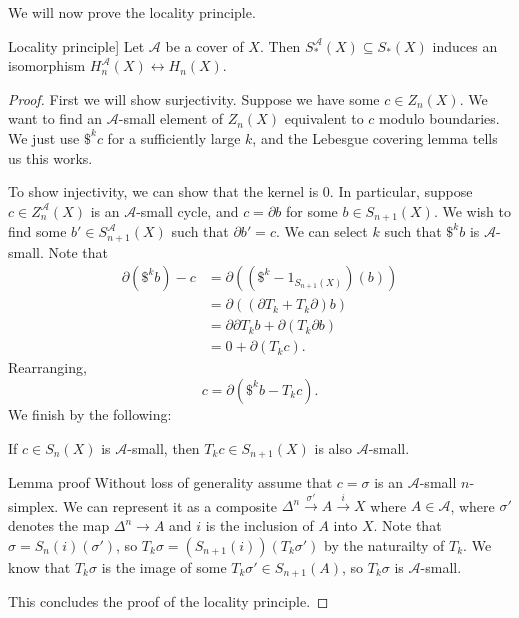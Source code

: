 \documentclass{standalone}
\begin{document}
We will now prove the locality principle.
\begin{theorem*}[\hyperref[thm:locality]{Locality principle}]
  Let \(\mathcal A\) be a cover of \(X\).
  Then \(S_*^{\mathcal A}(X) \subseteq S_*(X)\)
  induces an isomorphism \(H_n^{\mathcal A}(X) \leftrightarrow H_n(X)\).
\end{theorem*}
\begin{proof}
  First we will show surjectivity. Suppose we have some \(c \in Z_n(X)\).
  We want to find an \(\mathcal A\)-small element of \(Z_n(X)\) equivalent
  to \(c\) modulo boundaries. We just use \(\$^k c\) for a sufficiently large
  \(k\), and the Lebesgue covering lemma tells us this works.

  To show injectivity, we can show that the kernel is \(0\).
  In particular, suppose \(c \in Z_n^{\mathcal A}(X)\) is
  an \(\mathcal A\)-small cycle, and \(c = \partial b\) for some
  \(b \in S_{n+1}(X)\). We wish to find some \(b' \in S_{n+1}^{\mathcal A}(X)\)
  such that \(\partial b' = c\). We can select \(k\) such that \(\$^k b\) is
  \(\mathcal A\)-small. Note that
  \begin{align*}
    \partial(\$^k b) - c &= \partial ((\$^k - 1_{S_{n+1}(X)})(b)) \\
      &= \partial((\partial T_k + T_k \partial) b) \\
      &= \partial \partial T_k b + \partial (T_k \partial b) \\
      &= 0 + \partial (T_k c).
  \end{align*}
  Rearranging,
  \[
    c = \partial(\$^k b - T_k c).
  \]
  We finish by the following:
  \begin{lemma*}
    If \(c \in S_n(X)\) is \(\mathcal A\)-small, then
    \(T_k c \in S_{n+1}(X)\) is also \(\mathcal A\)-small.
  \end{lemma*}
  \begin{proof*}{Lemma proof}
    Without loss of generality assume that
    \(c = \sigma\) is an \(\mathcal A\)-small \(n\)-simplex.
    We can represent it as a composite
    \(\Delta^n \overset{\sigma'}\to A \overset{i}\to X\)
    where \(A \in \mathcal A\), where
      \(\sigma'\) denotes the map \(\Delta^n \to A\) and
      \(i\) is the inclusion of \(A\) into \(X\).
    Note that \(\sigma = S_n(i)(\sigma')\), so
    \(T_k \sigma = (S_{n+1}(i))(T_k \sigma')\)
    by the naturailty of \(T_k\).
    We know that \(T_k \sigma\) is the image of
    some \(T_k \sigma' \in S_{n+1}(A)\), so
    \(T_k \sigma\) is \(\mathcal A\)-small.
  \end{proof*}
  This concludes the proof of the locality principle.
\end{proof}
\end{document}
